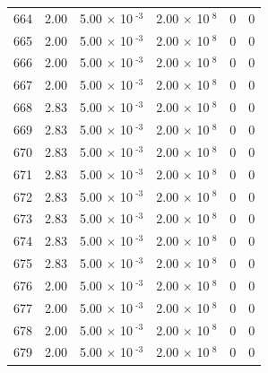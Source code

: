 \documentclass[a4paper,11pt]{article}
\begin{document}
\begin{center}
\begin{longtable}{|R{1.5cm}|R{2.4cm}|R{2.4cm}|R{2.4cm}|R{2.4cm}|R{2.4cm}|}
  664 &   2.00  &         5.00 $\times$ 10$^{\text{          -3}}$  &         2.00 $\times$ 10$^{\text{           8}}$  & 0  & 0 \\
  665 &   2.00  &         5.00 $\times$ 10$^{\text{          -3}}$  &         2.00 $\times$ 10$^{\text{           8}}$  & 0  & 0 \\
  666 &   2.00  &         5.00 $\times$ 10$^{\text{          -3}}$  &         2.00 $\times$ 10$^{\text{           8}}$  & 0  & 0 \\
  667 &   2.00  &         5.00 $\times$ 10$^{\text{          -3}}$  &         2.00 $\times$ 10$^{\text{           8}}$  & 0  & 0 \\
  668 &   2.83  &         5.00 $\times$ 10$^{\text{          -3}}$  &         2.00 $\times$ 10$^{\text{           8}}$  & 0  & 0 \\
  669 &   2.83  &         5.00 $\times$ 10$^{\text{          -3}}$  &         2.00 $\times$ 10$^{\text{           8}}$  & 0  & 0 \\
  670 &   2.83  &         5.00 $\times$ 10$^{\text{          -3}}$  &         2.00 $\times$ 10$^{\text{           8}}$  & 0  & 0 \\
  671 &   2.83  &         5.00 $\times$ 10$^{\text{          -3}}$  &         2.00 $\times$ 10$^{\text{           8}}$  & 0  & 0 \\
  672 &   2.83  &         5.00 $\times$ 10$^{\text{          -3}}$  &         2.00 $\times$ 10$^{\text{           8}}$  & 0  & 0 \\
  673 &   2.83  &         5.00 $\times$ 10$^{\text{          -3}}$  &         2.00 $\times$ 10$^{\text{           8}}$  & 0  & 0 \\
  674 &   2.83  &         5.00 $\times$ 10$^{\text{          -3}}$  &         2.00 $\times$ 10$^{\text{           8}}$  & 0  & 0 \\
  675 &   2.83  &         5.00 $\times$ 10$^{\text{          -3}}$  &         2.00 $\times$ 10$^{\text{           8}}$  & 0  & 0 \\
  676 &   2.00  &         5.00 $\times$ 10$^{\text{          -3}}$  &         2.00 $\times$ 10$^{\text{           8}}$  & 0  & 0 \\
  677 &   2.00  &         5.00 $\times$ 10$^{\text{          -3}}$  &         2.00 $\times$ 10$^{\text{           8}}$  & 0  & 0 \\
  678 &   2.00  &         5.00 $\times$ 10$^{\text{          -3}}$  &         2.00 $\times$ 10$^{\text{           8}}$  & 0  & 0 \\
  679 &   2.00  &         5.00 $\times$ 10$^{\text{          -3}}$  &         2.00 $\times$ 10$^{\text{           8}}$  & 0  & 0 \\

\end{longtable}
\end{center}
\end{document}
